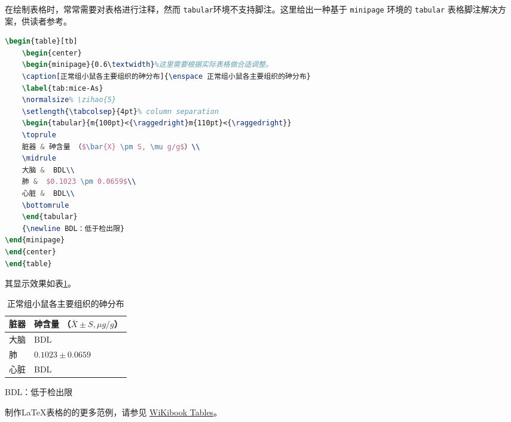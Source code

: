 \begin{example}在绘制表格时，常常需要对表格进行注释，然而 \verb|tabular|环境不支持脚注。这里给出一种基于 \verb|minipage| 环境的 \verb|tabular| 表格脚注解决方案，供读者参考。
\begin{lstlisting}[language=tex]
\begin{table}[tb]
    \begin{center}
	\begin{minipage}{0.6\textwidth}%这里需要根据实际表格做合适调整。
    \caption[正常组小鼠各主要组织的砷分布]{\enspace 正常组小鼠各主要组织的砷分布}
    \label{tab:mice-As}
    \normalsize% \zihao{5}
    \setlength{\tabcolsep}{4pt}% column separation
    \begin{tabular}{m{100pt}<{\raggedright}m{110pt}<{\raggedright}}
    \toprule
    脏器 & 砷含量 （$\bar{X} \pm S, \mu g/g$）\\
    \midrule
    大脑 &  BDL\\
    肺 &  $0.1023 \pm 0.0659$\\
    心脏 &  BDL\\
    \bottomrule
    \end{tabular}
    {\newline BDL：低于检出限}
\end{minipage}
\end{center}
\end{table}
\end{lstlisting}
其显示效果如表\ref{tab:mice-As}。
\end{example}
\begin{table}[tb]
    \begin{center}
	\begin{minipage}{0.6\textwidth}
    \caption[正常组小鼠各主要组织的砷分布]{\enspace 正常组小鼠各主要组织的砷分布}
    \label{tab:mice-As}
    \normalsize%
    \setlength{\tabcolsep}{4pt}%
    \begin{tabular}{m{100pt}<{\raggedright}m{110pt}<{\raggedright}}
    \toprule
    脏器 & 砷含量 （$\bar{X} \pm S, \mu g/g$）\\
    \midrule
    大脑 &  BDL\\
    肺 &  $0.1023 \pm 0.0659$\\
    心脏 &  BDL\\
    \bottomrule
    \end{tabular}
    {\newline BDL：低于检出限}
\end{minipage}
\end{center}
\end{table}
制作\LaTeX{}表格的的更多范例，请参见 \href{https://wikibooks.cn/wiki/LaTeX/Tables}{WiKibook Tables}。